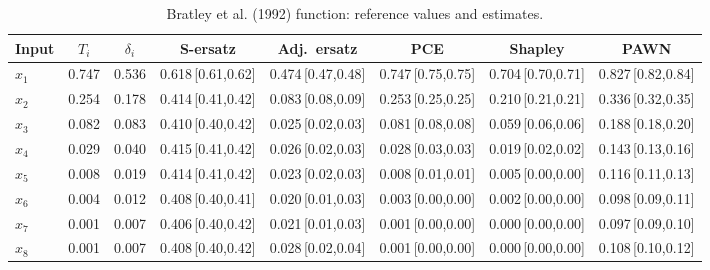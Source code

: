\documentclass[11pt,a4paper]{article}
\begin{document}
\begin{table}[H]\centering\footnotesize
\begin{tabular}{@{}lccccccc@{}}\toprule
Input & $T_i$ & $\delta_i$ & S-ersatz & Adj.\ ersatz & PCE & Shapley & PAWN \\ \midrule
$x_{1}$ & 0.747 & 0.536 & 0.618\,{\scriptsize[0.61,0.62]} & 0.474\,{\scriptsize[0.47,0.48]} & 0.747\,{\scriptsize[0.75,0.75]} & 0.704\,{\scriptsize[0.70,0.71]} & 0.827\,{\scriptsize[0.82,0.84]} \\
$x_{2}$ & 0.254 & 0.178 & 0.414\,{\scriptsize[0.41,0.42]} & 0.083\,{\scriptsize[0.08,0.09]} & 0.253\,{\scriptsize[0.25,0.25]} & 0.210\,{\scriptsize[0.21,0.21]} & 0.336\,{\scriptsize[0.32,0.35]} \\
$x_{3}$ & 0.082 & 0.083 & 0.410\,{\scriptsize[0.40,0.42]} & 0.025\,{\scriptsize[0.02,0.03]} & 0.081\,{\scriptsize[0.08,0.08]} & 0.059\,{\scriptsize[0.06,0.06]} & 0.188\,{\scriptsize[0.18,0.20]} \\
$x_{4}$ & 0.029 & 0.040 & 0.415\,{\scriptsize[0.41,0.42]} & 0.026\,{\scriptsize[0.02,0.03]} & 0.028\,{\scriptsize[0.03,0.03]} & 0.019\,{\scriptsize[0.02,0.02]} & 0.143\,{\scriptsize[0.13,0.16]} \\
$x_{5}$ & 0.008 & 0.019 & 0.414\,{\scriptsize[0.41,0.42]} & 0.023\,{\scriptsize[0.02,0.03]} & 0.008\,{\scriptsize[0.01,0.01]} & 0.005\,{\scriptsize[0.00,0.00]} & 0.116\,{\scriptsize[0.11,0.13]} \\
$x_{6}$ & 0.004 & 0.012 & 0.408\,{\scriptsize[0.40,0.41]} & 0.020\,{\scriptsize[0.01,0.03]} & 0.003\,{\scriptsize[0.00,0.00]} & 0.002\,{\scriptsize[0.00,0.00]} & 0.098\,{\scriptsize[0.09,0.11]} \\
$x_{7}$ & 0.001 & 0.007 & 0.406\,{\scriptsize[0.40,0.42]} & 0.021\,{\scriptsize[0.01,0.03]} & 0.001\,{\scriptsize[0.00,0.00]} & 0.000\,{\scriptsize[0.00,0.00]} & 0.097\,{\scriptsize[0.09,0.10]} \\
$x_{8}$ & 0.001 & 0.007 & 0.408\,{\scriptsize[0.40,0.42]} & 0.028\,{\scriptsize[0.02,0.04]} & 0.001\,{\scriptsize[0.00,0.00]} & 0.000\,{\scriptsize[0.00,0.00]} & 0.108\,{\scriptsize[0.10,0.12]} \\
\bottomrule\end{tabular}
\caption{Bratley et al. (1992) function: reference values and estimates.}
\label{tab:in2}
\end{table}
\end{document}
